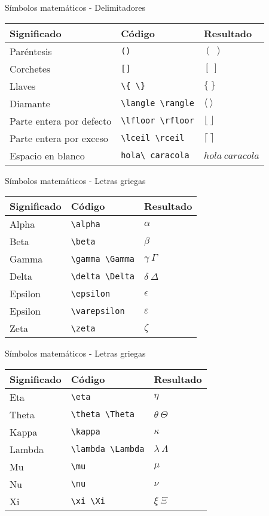 \documentclass[
  ignorenonframetext,
]{beamer}
\begin{document}
\begin{frame}[fragile]{Símbolos matemáticos - Delimitadores}
\protect\hypertarget{suxedmbolos-matemuxe1ticos---delimitadores}{}
\begin{longtable}[]{@{}lll@{}}
\toprule
Significado & Código & Resultado\tabularnewline
\midrule
\endhead
Paréntesis & \texttt{()} & \((\ )\)\tabularnewline
Corchetes & \texttt{{[}{]}} & \([\ ]\)\tabularnewline
Llaves & \texttt{\textbackslash{}\{\ \textbackslash{}\}} &
\(\{\ \}\)\tabularnewline
Diamante & \texttt{\textbackslash{}langle\ \textbackslash{}rangle} &
\(\langle\ \rangle\)\tabularnewline
Parte entera por defecto &
\texttt{\textbackslash{}lfloor\ \textbackslash{}rfloor} &
\(\lfloor\  \rfloor\)\tabularnewline
Parte entera por exceso &
\texttt{\textbackslash{}lceil\ \textbackslash{}rceil} &
\(\lceil\ \rceil\)\tabularnewline
Espacio en blanco & \texttt{hola\textbackslash{}\ caracola} &
\(hola\ caracola\)\tabularnewline
\bottomrule
\end{longtable}
\end{frame}

\begin{frame}[fragile]{Símbolos matemáticos - Letras griegas}
\protect\hypertarget{suxedmbolos-matemuxe1ticos---letras-griegas}{}
\begin{longtable}[]{@{}lll@{}}
\toprule
Significado & Código & Resultado\tabularnewline
\midrule
\endhead
Alpha & \texttt{\textbackslash{}alpha} & \(\alpha\)\tabularnewline
Beta & \texttt{\textbackslash{}beta} & \(\beta\)\tabularnewline
Gamma & \texttt{\textbackslash{}gamma\ \textbackslash{}Gamma} &
\(\gamma\  \Gamma\)\tabularnewline
Delta & \texttt{\textbackslash{}delta\ \textbackslash{}Delta} &
\(\delta\  \Delta\)\tabularnewline
Epsilon & \texttt{\textbackslash{}epsilon} & \(\epsilon\)\tabularnewline
Epsilon & \texttt{\textbackslash{}varepsilon} &
\(\varepsilon\)\tabularnewline
Zeta & \texttt{\textbackslash{}zeta} & \(\zeta\)\tabularnewline
\bottomrule
\end{longtable}
\end{frame}

\begin{frame}[fragile]{Símbolos matemáticos - Letras griegas}
\protect\hypertarget{suxedmbolos-matemuxe1ticos---letras-griegas-1}{}
\begin{longtable}[]{@{}lll@{}}
\toprule
Significado & Código & Resultado\tabularnewline
\midrule
\endhead
Eta & \texttt{\textbackslash{}eta} & \(\eta\)\tabularnewline
Theta & \texttt{\textbackslash{}theta\ \textbackslash{}Theta} &
\(\theta\ \Theta\)\tabularnewline
Kappa & \texttt{\textbackslash{}kappa} & \(\kappa\)\tabularnewline
Lambda & \texttt{\textbackslash{}lambda\ \textbackslash{}Lambda} &
\(\lambda\  \Lambda\)\tabularnewline
Mu & \texttt{\textbackslash{}mu} & \(\mu\)\tabularnewline
Nu & \texttt{\textbackslash{}nu} & \(\nu\)\tabularnewline
Xi & \texttt{\textbackslash{}xi\ \textbackslash{}Xi} &
\(\xi\ \Xi\)\tabularnewline
\bottomrule
\end{longtable}
\end{frame}
\end{document}
